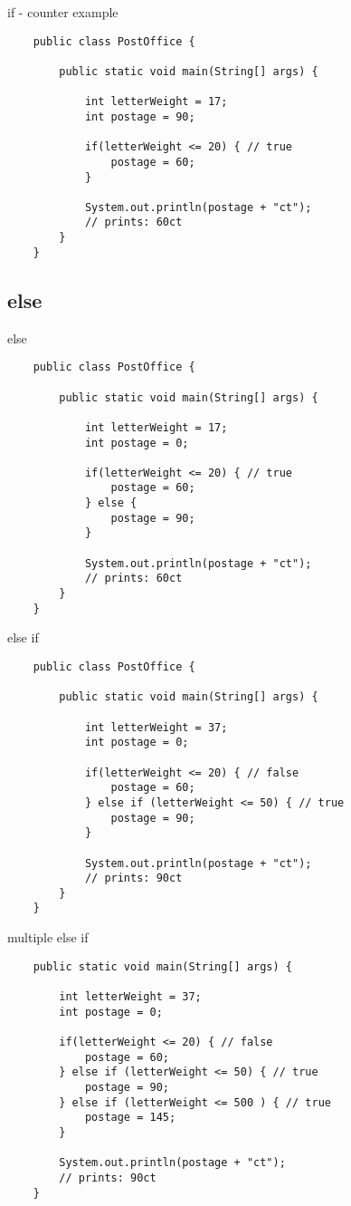 \begin{frame}[fragile]{if - counter example}
	\begin{lstlisting}
	public class PostOffice {
	
	    public static void main(String[] args) {
	
	        int letterWeight = 17;
	        int postage = 90;
	    
	        if(letterWeight <= 20) { // true
	            postage = 60;
	        }
	        
	        System.out.println(postage + "ct");
	        // prints: 60ct
	    }
	}
	\end{lstlisting}
\end{frame}

\subsection{else}
\begin{frame}[fragile]{else}
	\begin{lstlisting}
	public class PostOffice {
	
	    public static void main(String[] args) {
	
	        int letterWeight = 17;
	        int postage = 0;
	    
	        if(letterWeight <= 20) { // true
	            postage = 60;
	        } else {
	            postage = 90;
	        }
	        
	        System.out.println(postage + "ct");
	        // prints: 60ct
	    }
	}
	\end{lstlisting}
\end{frame}

\begin{frame}[fragile]{else if}
	\begin{lstlisting}
	public class PostOffice {
	
	    public static void main(String[] args) {
	
	        int letterWeight = 37;
	        int postage = 0;
	    
	        if(letterWeight <= 20) { // false
	            postage = 60;
	        } else if (letterWeight <= 50) { // true
	            postage = 90;
	        }
	        
	        System.out.println(postage + "ct");
	        // prints: 90ct
	    }
	}
	\end{lstlisting}
\end{frame}

\begin{frame}[fragile]{multiple else if}
	\begin{lstlisting}
	public static void main(String[] args) {
	
	    int letterWeight = 37;
	    int postage = 0;
	    
	    if(letterWeight <= 20) { // false
	        postage = 60;
	    } else if (letterWeight <= 50) { // true
	        postage = 90;
	    } else if (letterWeight <= 500 ) { // true
	        postage = 145;
	    }
	        
	    System.out.println(postage + "ct");
	    // prints: 90ct
	}
	\end{lstlisting}
\end{frame}

